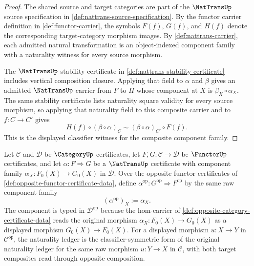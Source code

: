 \begin{proof}
The shared source and target categories are part of the \(\NatTransUp\) source specification in \autoref{def:nattrans-source-specification}. By the functor carrier definition in \autoref{def:functor-carrier}, the symbols \(F(f)\), \(G(f)\), and \(H(f)\) denote the corresponding target-category morphism images. By \autoref{def:nattrans-carrier}, each admitted natural transformation is an object-indexed component family with a naturality witness for every source morphism.

The \(\NatTransUp\) stability certificate in \autoref{def:nattrans-stability-certificate} includes vertical composition closure. Applying that field to \(\alpha\) and \(\beta\) gives an admitted \(\NatTransUp\) carrier from \(F\) to \(H\) whose component at \(X\) is \(\beta_X\circ\alpha_X\). The same stability certificate lists naturality square validity for every source morphism, so applying that naturality field to this composite carrier and to \(f:C\to C'\) gives
$$
  H(f)\circ(\beta\circ\alpha)_C
  \sim
  (\beta\circ\alpha)_{C'}\circ F(f).
$$
This is the displayed classifier witness for the composite component family.
\end{proof}

\begin{definition}
\label{def:opposite-nattrans-certificate-data}
Let $\mathcal C$ and $\mathcal D$ be $\CategoryUp$ certificates, let $F,G:\mathcal C\to\mathcal D$ be $\FunctorUp$ certificates, and let
$\alpha:F\Rightarrow G$ be a $\NatTransUp$ certificate with component family $\alpha_X:F_0(X)\to G_0(X)$ in $\mathcal D$. Over the
opposite-functor certificates of \autoref{def:opposite-functor-certificate-data}, define $\alpha^{\mathrm{op}}:G^{\mathrm{op}}\Rightarrow F^{\mathrm{op}}$ by the same raw component family
$$
(\alpha^{\mathrm{op}})_X:=\alpha_X.
$$
The component is typed in $\mathcal D^{\mathrm{op}}$ because the hom-carrier of \autoref{def:opposite-category-certificate-data} reads the original
morphism $\alpha_X:F_0(X)\to G_0(X)$ as a displayed morphism $G_0(X)\to F_0(X)$. For a displayed morphism $u:X\to Y$ in
$\mathcal C^{\mathrm{op}}$, the naturality ledger is the classifier-symmetric form of the original naturality ledger for the same raw morphism
$u:Y\to X$ in $\mathcal C$, with both target composites read through opposite composition.
\end{definition}


